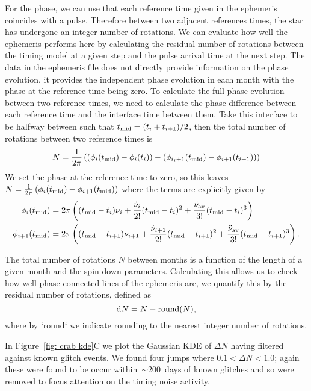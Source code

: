 \documentclass[../full_thesis/full_thesis.tex]{subfiles}
\begin{document}
{For the phase, we can use that each reference time given in the ephemeris
coincides with a pulse. Therefore between two adjacent references times, the
star has undergone an integer number of rotations. We can evaluate how well the
ephemeris performs here by calculating the residual number of rotations between
the timing model at a given step and the pulse arrival time at the next step.
The data in the ephemeris file does not directly provide information on the
phase evolution, it provides the independent phase evolution in each month with
the phase at the reference time being zero. To calculate the full phase
evolution between two reference times, we need to calculate the phase
difference between each reference time and the interface time between them.
Take this interface to be halfway between such that $t_{\textrm{mid}}=(t_{i} +
t_{i+1})/2$, then the total number of rotations between two reference times is
\begin{equation}
    N = \frac{1}{2\pi}\left(\left(\phi_{i}(t_{\textrm{mid}}) - \phi_{i}(t_{i})\right) -
    \left(\phi_{i_i+1}(t_{\textrm{mid}}) - \phi_{i+1}(t_{i+1})\right)\right)
\end{equation}
We set the phase at the reference time to zero, so this leaves $N =
\frac{1}{2\pi}\left(\phi_{i}(t_{\textrm{mid}}) - \phi_{i+1}(t_{\textrm{mid}})\right)$ where the terms
are explicitly given by
\begin{align}
\phi_{i}(t_{\textrm{mid}}) & = 2\pi\left((t_{\textrm{mid}} - t_{i})\nu_{i} +  \frac{\dot{\nu}_{i}}{2!}(t_{\textrm{mid}} - t_{i})^{2}+\frac{\ddot{\nu}_{\textrm{av}}}{3!}(t_{\textrm{mid}} - t_{i})^{3}\right) \\
\phi_{i+1}(t_{\textrm{mid}}) & = 2\pi\left((t_{\textrm{mid}} - t_{i+1})\nu_{i+1} +  \frac{\dot{\nu}_{i+1}}{2!}(t_{\textrm{mid}} - t_{i+1})^{2}+\frac{\ddot{\nu}_{\textrm{av}}}{3!}(t_{\textrm{mid}} - t_{i+1})^{3}\right) .
\end{align}

The total number of rotations $N$ between months is a function of
the length of a given month and the spin-down parameters. Calculating this
allows us to check how well phase-connected lines of the ephemeris are,
we quantify this by the residual number of rotations, defined as
\begin{equation}
\mathrm{d} N = N - \textrm{round}(N),
\end{equation}
where by `round` we indicate rounding to the nearest integer number of rotations.

In Figure~\ref{fig: crab kde}C we plot the Gaussian KDE of $\Delta N$ having filtered
against known glitch events. We found four jumps where $0.1 < \Delta N < 1.0$;
again these were found to be occur within~$\sim200$~days of known glitches and
so were removed to focus attention on the timing noise activity.

}
\end{document}
